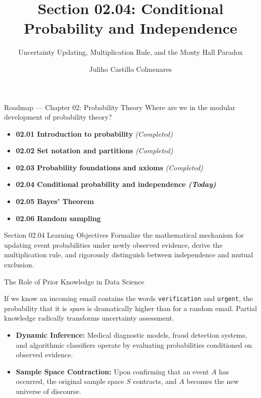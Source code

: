 \documentclass[10pt,aspectratio=169]{beamer}
\title[Conditional Probability \& Independence]{Section 02.04: Conditional Probability and Independence}
\subtitle{Uncertainty Updating, Multiplication Rule, and the Monty Hall Paradox}
\author[J. Castillo Colmenares]{Juliho Castillo Colmenares}
\institute{Tecnologico de Monterrey}
\date{}
\begin{document}
\begin{frame}[plain]
  \titlepage
\end{frame}

\begin{frame}{Roadmap — Chapter 02: Probability Theory}
  Where are we in the modular development of probability theory? \pause
  \begin{itemize}\itemsep=0.1em
    \item \textbf{02.01 Introduction to probability} \emph{(Completed)} \pause
    \item \textbf{02.02 Set notation and partitions} \emph{(Completed)} \pause
    \item \textbf{02.03 Probability foundations and axioms} \emph{(Completed)} \pause
    \item \color{TecRojo}\textbf{02.04 Conditional probability and independence \emph{(Today)}}\color{black} \pause
    \item \textbf{02.05 Bayes' Theorem} \pause
    \item \textbf{02.06 Random sampling}
  \end{itemize}
  \vspace{0.4em}
  \begin{block}{Section 02.04 Learning Objectives}
    Formalize the mathematical mechanism for updating event probabilities under newly observed evidence, derive the multiplication rule, and rigorously distinguish between independence and mutual exclusion.
  \end{block}
\end{frame}

\begin{frame}{The Role of Prior Knowledge in Data Science}
  \begin{motivation}
    If we know an incoming email contains the words \texttt{verification} and \texttt{urgent}, the probability that it is \emph{spam} is dramatically higher than for a random email. Partial knowledge radically transforms uncertainty assessment.
  \end{motivation}
  
  \vspace{0.3em}
  \pause
  \begin{itemize}\itemsep=0.1em
    \item \textbf{Dynamic Inference:} Medical diagnostic models, fraud detection systems, and algorithmic classifiers operate by evaluating probabilities conditioned on observed evidence. \pause
    \item \textbf{Sample Space Contraction:} Upon confirming that an event $A$ has occurred, the original sample space $S$ contracts, and $A$ becomes the new universe of discourse.
  \end{itemize}
\end{frame}
\end{document}
